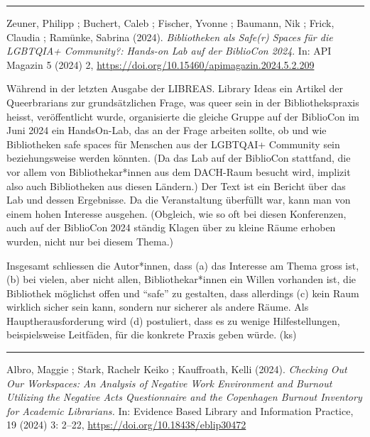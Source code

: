 \documentclass[a4paper,
fontsize=11pt,
oneside,
numbers=noperiodatend,
parskip=half-,
bibliography=totoc,
final
]{scrartcl}
\begin{document}
\begin{center}\rule{0.5\linewidth}{0.5pt}\end{center}

Zeuner, Philipp ; Buchert, Caleb ; Fischer, Yvonne ; Baumann, Nik ;
Frick, Claudia ; Ramünke, Sabrina (2024). \emph{Bibliotheken als Safe(r)
Spaces für die LGBTQIA+ Community?: Hands-on Lab auf der BiblioCon
2024}. In: API Magazin 5 (2024) 2,
\url{https://doi.org/10.15460/apimagazin.2024.5.2.209}

Während in der letzten Ausgabe der LIBREAS. Library Ideas ein Artikel
der Queerbrarians zur grundsätzlichen Frage, was queer sein in der
Bibliothekspraxis heisst, veröffentlicht wurde, organisierte die gleiche
Gruppe auf der BiblioCon im Juni 2024 ein HandsOn-Lab, das an der Frage
arbeiten sollte, ob und wie Bibliotheken safe spaces für Menschen aus
der LGBTQAI+ Community sein beziehungsweise werden könnten. (Da das Lab
auf der BiblioCon stattfand, die vor allem von Bibliothekar*innen aus
dem DACH-Raum besucht wird, implizit also auch Bibliotheken aus diesen
Ländern.) Der Text ist ein Bericht über das Lab und dessen Ergebnisse.
Da die Veranstaltung überfüllt war, kann man von einem hohen Interesse
ausgehen. (Obgleich, wie so oft bei diesen Konferenzen, auch auf der
BiblioCon 2024 ständig Klagen über zu kleine Räume erhoben wurden, nicht
nur bei diesem Thema.)

Insgesamt schliessen die Autor*innen, dass (a) das Interesse am Thema
gross ist, (b) bei vielen, aber nicht allen, Bibliothekar*innen ein
Willen vorhanden ist, die Bibliothek möglichst offen und ``safe'' zu
gestalten, dass allerdings (c) kein Raum wirklich sicher sein kann,
sondern nur sicherer als andere Räume. Als Hauptherausforderung wird (d)
postuliert, dass es zu wenige Hilfestellungen, beispielsweise Leitfäden,
für die konkrete Praxis geben würde. (ks)

\begin{center}\rule{0.5\linewidth}{0.5pt}\end{center}

Albro, Maggie ; Stark, Rachelr Keiko ; Kauffroath, Kelli (2024).
\emph{Checking Out Our Workspaces: An Analysis of Negative Work
Environment and Burnout Utilizing the Negative Acts Questionnaire and
the Copenhagen Burnout Inventory for Academic Librarians.} In: Evidence
Based Library and Information Practice, 19 (2024) 3: 2--22,
\url{https://doi.org/10.18438/eblip30472}
\end{document}
